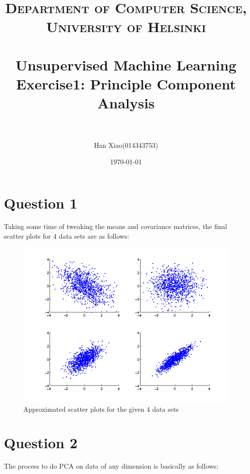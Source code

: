 \documentclass[paper=a4, fontsize=11pt]{scrartcl} %
\title{	
\normalfont \normalsize 
\textsc{Department of Computer Science, University of Helsinki} \\ [25pt] %
\horrule{0.5pt} \\[0.4cm] %
\huge Unsupervised Machine Learning \newline Exercise1: Principle Component Analysis \\ %
\horrule{2pt} \\[0.5cm] %
}
\author{Han Xiao(014343753)} %
\date{\normalsize\today} %
\numberwithin{equation}{section} %
\numberwithin{figure}{section} %
\numberwithin{table}{section} %
\begin{document}
\maketitle %


\section{Question 1}

Taking some time of tweaking the means and covariance matrices, the final scatter plots for 4 data sets are as follows:

\begin{figure}[H]
  \centering
  \includegraphics[scale=.7]{scatter_points}
  \caption{Approximated scatter plots for the given 4 data sets}
\end{figure}





\section{Question 2}
The process to do PCA on data of any dimension is basically as follows:
\end{document}
